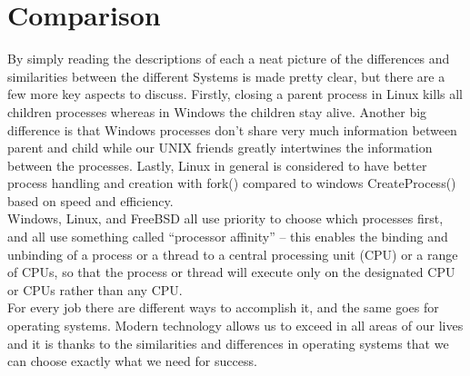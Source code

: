 \documentclass[onecolumn, draftclsnofoot,10pt, compsoc]{IEEEtran}
\begin{document}
\section{Comparison}
By simply reading the descriptions of each a neat picture of the differences and similarities between the different Systems is made pretty clear, but there are a few more key aspects to discuss. Firstly, closing a parent process in Linux kills all children processes whereas in Windows the children stay alive. Another big difference is that Windows processes don’t share very much information between parent and child while our UNIX friends greatly intertwines the information between the processes. Lastly, Linux in general is considered to have better process handling and creation with fork() compared to windows CreateProcess() based on speed and efficiency. \\

Windows, Linux, and FreeBSD all use priority to choose which processes first, and all use something called “processor affinity” – this enables the binding and unbinding of a process or a thread to a central processing unit (CPU) or a range of CPUs, so that the process or thread will execute only on the designated CPU or CPUs rather than any CPU. \cite{TMurgent} \\

For every job there are different ways to accomplish it, and the same goes for operating systems. Modern technology allows us to exceed in all areas of our lives and it is thanks to the similarities and differences in operating systems that we can choose exactly what we need for success. \\
\end{document}
